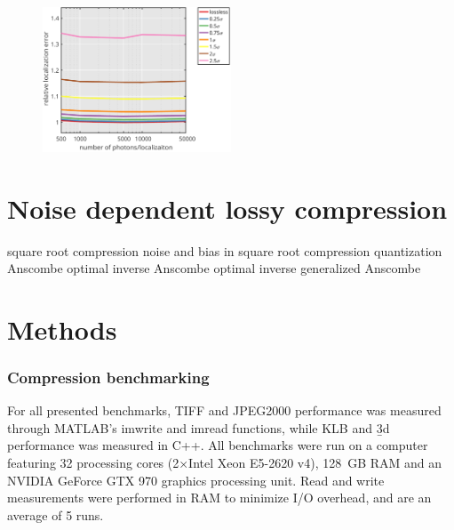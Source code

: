     \begin{figure}[tpb]
      \centering
      \includegraphics[page=1,width=0.5\textwidth]{SFig6_locprecVsNphotons}
      \label{fig:SFig6_locprecVsNphotons}
    \end{figure}



\section{Noise dependent lossy compression}
  
  square root compression \cite{gowen_square_2003}
  noise and bias in square root compression \cite{bernstein_noise_2010}
  quantization \cite{gray_quantization_1998}
  Anscombe \cite{anscombe_transformation_1948}
  optimal inverse Anscombe \cite{makitalo_optimal_2011,makitalo_closed-form_2011}
  optimal inverse generalized Anscombe \cite{makitalo_optimal_2013}

\section{Methods}
  
\subsubsection{Compression benchmarking}
For all presented benchmarks, TIFF and JPEG2000 performance was measured through MATLAB's imwrite and imread functions, while KLB and \b3d performance was measured in C++. All benchmarks were run on a computer featuring 32 processing cores (2×Intel Xeon E5-2620 v4), \SI{128}{GB} RAM and an NVIDIA GeForce GTX 970 graphics processing unit. Read and write measurements were performed in RAM to minimize I/O overhead, and are an average of 5 runs.

